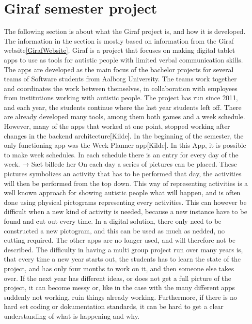 \section{Giraf semester project} %
\label{cha:Giraf semester project}

The following section is about what the Giraf project is, and how it is developed. The information in the section is mostly based on information from the Giraf website\ref{GirafWebsite}.
Giraf is a project that focuses on making digital tablet apps to use as tools for autistic people with limited verbal communication skills. The apps are developed as the main focus of the bachelor projects for several teams of Software students from Aalborg University. The teams work together and coordinates the work between themselves, in collaboration with employees from institutions working with  autistic people. The project has run since 2011, and each year, the students continue where the last year students left off. 
There are already developed many tools, among them both games and a week schedule. However, many of the apps that worked at one point, stopped working after changes in the backend architecture[Kilde]. 
In the beginning of the semester, the only functioning app was the Week Planner app[Kilde]. In this App, it is possible to make week schedules. In each schedule there is an entry for every day of the week\label{pic:WeekPlannerPicture}. 
→ Sæt billede her 
On each day a series of pictures can be placed. These pictures symbolizes an activity that has to be performed that day, the activities will then be performed from the top down. 
This way of representing activities is a well known approach for showing autistic people what will happen, and is often done using physical pictograms representing every activities. This can however be difficult when a new kind of activity is needed, because a new instance have to be found and cut out every time\cite{AutistTeacher}. In a digital solution, there only need to be constructed a new pictogram, and this can be used as much as nedded, no cutting required. 
The other apps are no longer used, and will therefore not be described. 
The difficulty in having a multi group project run over many years is, that every time a new year starts out, the students has to learn the state of the project, and has only four months to work on it, and then someone else takes over. If the next year has different ideas, or does not get a full picture of the project, it can become messy or, like in the case with the many different apps suddenly not working, ruin things already working. Furthermore, if there is no hard set coding or dokumentation standards, it can be hard to get a clear understanding of what is happening and why.
